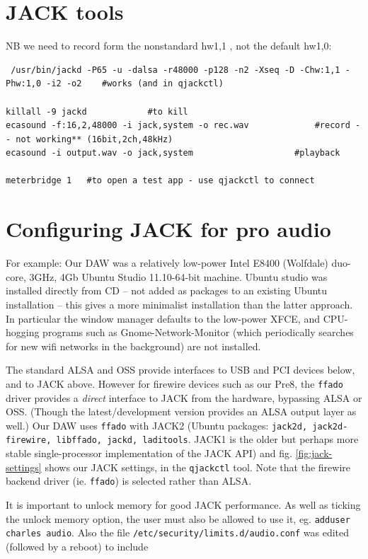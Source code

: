 \documentclass[oneside,english]{scrbook}
\begin{document}
\section{JACK tools}
NB we need to record form the nonstandard hw1,1 , not the default hw1,0:

\begin{lstlisting}
 /usr/bin/jackd -P65 -u -dalsa -r48000 -p128 -n2 -Xseq -D -Chw:1,1 -Phw:1,0 -i2 -o2    #works (and in qjackctl)

killall -9 jackd			#to kill
ecasound -f:16,2,48000 -i jack,system -o rec.wav  			 #record -- not working** (16bit,2ch,48kHz)
ecasound -i output.wav -o jack,system 					 #playback

meterbridge 1   #to open a test app - use qjackctl to connect
\end{lstlisting}

\section{Configuring JACK for pro audio}

For example: Our DAW was a relatively low-power Intel E8400 (Wolfdale) duo-core, 3GHz, 4Gb Ubuntu Studio 11.10-64-bit machine.   Ubuntu studio was installed directly from CD -- not added as packages to an existing Ubuntu installation -- this gives a more minimalist installation than the latter approach.  In particular the window manager defaults to the low-power XFCE, and CPU-hogging programs such as Gnome-Network-Monitor (which periodically searches for new wifi networks in the background) are not installed.

The standard ALSA and OSS provide interfaces to USB and PCI devices below, and to JACK above.  However for firewire devices such as our Pre8, the {\tt ffado} driver  provides a {\em direct} interface to JACK from the hardware, bypassing ALSA or OSS.  (Though the latest/development version provides an ALSA output layer as well.)   Our DAW uses {\tt ffado} with JACK2 (Ubuntu packages: {\tt jack2d, jack2d-firewire, libffado, jackd, laditools}.  JACK1 is the older but perhaps more stable single-processor implementation of the JACK API) and fig. \ref{fig:jack-settings} shows our JACK settings, in the {\tt qjackctl} tool.  Note that the firewire backend driver (ie. {\tt ffado}) is selected rather than ALSA.

It is important to unlock memory for good JACK performance.  As well as ticking the unlock memory option, the user must also be allowed to use it, eg. {\tt adduser charles audio}.  Also the file {\tt /etc/security/limits.d/audio.conf} was edited (followed by a reboot) to include
\end{document}
